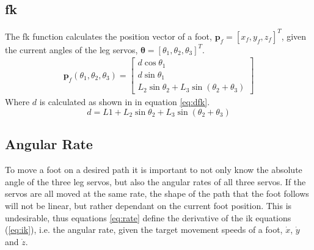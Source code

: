     \subsection{\acf{fk}}
        The \ac{fk} function calculates the position vector of a foot, \(\bm{p}_f = [x_f,y_f,z_f]^T\),
        given the current angles of the leg servos, \(\bm{\theta} = [\theta_1, \theta_2, \theta_3]^T\).
        \begin{align}
            \bm{p}_f(\theta_1,\theta_2,\theta_3) =
                            \begin{bmatrix}
                                d\cos{\theta_1}\\
                                d\sin{\theta_1}\\
                                L_2\sin{\theta_2} + L_3\sin{\left(\theta_2 + \theta_3\right)}
                            \end{bmatrix}
        \end{align}
        Where \(d\) is calculated as shown in in equation \ref{eq:dfk}.
        \begin{equation}\label{eq:dfk}
            d = L1 + L_2\sin{\theta_2} + L_3\sin{(\theta_2 + \theta_3)}
        \end{equation}
    
    \subsection{Angular Rate}
    To move a foot on a desired path it is important to not only know the absolute angle of the three leg servos, but also the angular rates of all three
    servos. If the servos are all moved at the same rate, the shape of the path that the foot follows will not be linear, but rather dependant on the
    current foot position. This is undesirable, thus equations \ref{eq:rate} define the derivative of the \ac{ik} equations (\ref{eq:ik}), i.e. the angular
    rate, given the target movement speeds of a foot, \(\dot{x}\), \(\dot{y}\) and \(\dot{z}\).

